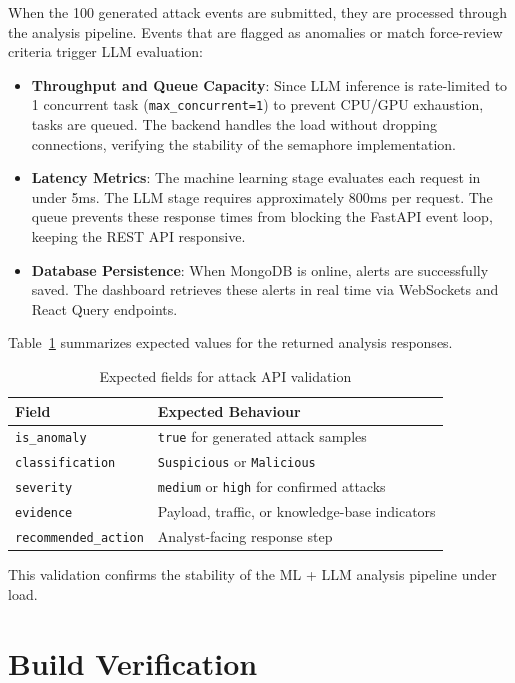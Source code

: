 \documentclass[12pt,a4paper]{report}
\begin{document}
When the 100 generated attack events are submitted, they are processed through the analysis pipeline. Events that are flagged as anomalies or match force-review criteria trigger LLM evaluation:
\begin{itemize}[leftmargin=1.5em]
  \item \textbf{Throughput and Queue Capacity}: Since LLM inference is rate-limited to 1 concurrent task (\texttt{max\_concurrent=1}) to prevent CPU/GPU exhaustion, tasks are queued. The backend handles the load without dropping connections, verifying the stability of the semaphore implementation.
  \item \textbf{Latency Metrics}: The machine learning stage evaluates each request in under 5ms. The LLM stage requires approximately 800ms per request. The queue prevents these response times from blocking the FastAPI event loop, keeping the REST API responsive.
  \item \textbf{Database Persistence}: When MongoDB is online, alerts are successfully saved. The dashboard retrieves these alerts in real time via WebSockets and React Query endpoints.
\end{itemize}

Table~\ref{tab:attack-api-result} summarizes expected values for the returned analysis responses.

\begin{table}[htbp]
  \centering
  \caption{Expected fields for attack API validation}
  \label{tab:attack-api-result}
  \begin{tabular}{ll}
    \toprule
    \textbf{Field} & \textbf{Expected Behaviour} \\
    \midrule
    \texttt{is\_anomaly} & \texttt{true} for generated attack samples \\
    \texttt{classification} & \texttt{Suspicious} or \texttt{Malicious} \\
    \texttt{severity} & \texttt{medium} or \texttt{high} for confirmed attacks \\
    \texttt{evidence} & Payload, traffic, or knowledge-base indicators \\
    \texttt{recommended\_action} & Analyst-facing response step \\
    \bottomrule
  \end{tabular}
\end{table}

This validation confirms the stability of the ML + LLM analysis pipeline under load.

\section{Build Verification}
\end{document}
